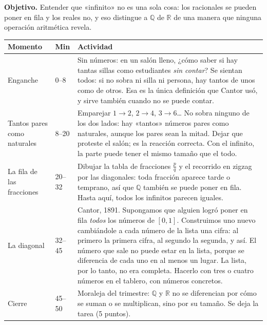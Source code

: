 \documentclass[11pt]{article}
\begin{document}

\textbf{Objetivo.} Entender que «infinito» no es una sola cosa: los racionales se pueden poner
en fila y los reales no, y eso distingue a $\mathbb{Q}$ de $\mathbb{R}$ de una manera que
ninguna operación aritmética revela.

\begin{center}
{\renewcommand{\arraystretch}{1.3}
\begin{tabularx}{\linewidth}{@{}l l X@{}}
  \toprule
  \textbf{Momento} & \textbf{Min} & \textbf{Actividad}\\
  \midrule
  Enganche & 0--8 & Sin números: en un salón lleno, ¿cómo saber si hay tantas sillas como
    estudiantes \emph{sin contar}? Se sientan todos: si no sobra ni silla ni persona, hay
    tantos de unos como de otros. Esa es la única definición que Cantor usó, y sirve también
    cuando no se puede contar.\\
  Tantos pares como naturales & 8--20 & Emparejar $1\!\to\!2$, $2\!\to\!4$, $3\!\to\!6$… No
    sobra ninguno de los dos lados: hay «tantos» números pares como naturales, aunque los
    pares sean la mitad. Dejar que proteste el salón; es la reacción correcta. Con el infinito,
    la parte puede tener el mismo tamaño que el todo.\\
  La fila de las fracciones & 20--32 & Dibujar la tabla de fracciones $\frac{p}{q}$ y el
    recorrido en zigzag por las diagonales: toda fracción aparece tarde o temprano, así que
    $\mathbb{Q}$ también se puede poner en fila. Hasta aquí, todos los infinitos parecen
    iguales.\\
  La diagonal & 32--45 & Cantor, 1891. Supongamos que alguien logró poner en fila
    \emph{todos} los números de $[0,1]$. Construimos uno nuevo cambiándole a cada número de la
    lista una cifra: al primero la primera cifra, al segundo la segunda, y así. El número que
    sale no puede estar en la lista, porque se diferencia de cada uno en al menos un lugar.
    La lista, por lo tanto, no era completa. Hacerlo con tres o cuatro números en el tablero,
    con números concretos.\\
  Cierre & 45--50 & Moraleja del trimestre: $\mathbb{Q}$ y $\mathbb{R}$ no se diferencian por
    cómo se suman o se multiplican, sino por su tamaño. Se deja la tarea (5 puntos).\\
  \bottomrule
\end{tabularx}}
\end{center}
\end{document}
